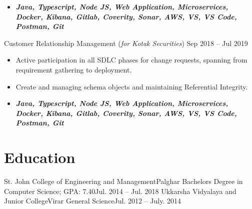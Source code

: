 \documentclass{resume}
\begin{document}
            \begin{itemize}[leftmargin=-0.15in, label={}]
                \item\textit{\textbf{\fontsize{10}{12}\selectfont Java, Typescript, Node JS, Web Application, Microservices, Docker, Kibana, Gitlab, Coverity, Sonar, AWS, VS, VS Code, Postman, Git}}
            \end{itemize}

        \projectTwoHead
        {Customer Relationship Management (\normalfont \textit{for Kotak Securities})}
        {Sep 2018 -- Jul 2019}
            \begin{itemize}[leftmargin=0in, label={-}]
                \item\small Active participation in all SDLC phases for change requests, spanning from requirement gathering to  deployment.
                \item\small Create and managing schema objects and maintaining Referential Integrity.
            \end{itemize}
    
            \begin{itemize}[leftmargin=-0.15in, label={}]
                \item\textit{\textbf{\fontsize{10}{12}\selectfont Java, Typescript, Node JS, Web Application, Microservices, Docker, Kibana, Gitlab, Coverity, Sonar, AWS, VS, VS Code, Postman, Git}}
            \end{itemize}
    \resumeItemListEnd
    
    \resumeSubHeadingListEnd

\section{Education}
  \resumeSubHeadingListStart
    \resumeSubheading
      {St. John College of Engineering and Management}{Palghar}
      {Bachelors Degree in Computer Science;  GPA: 7.40}{Jul. 2014 -- Jul. 2018}
    \resumeSubheading
      {Ukkarsha Vidyalaya and Junior College}{Virar}
      {General Science}{Jul. 2012 -- July. 2014}
  \resumeSubHeadingListEnd



\end{document}
